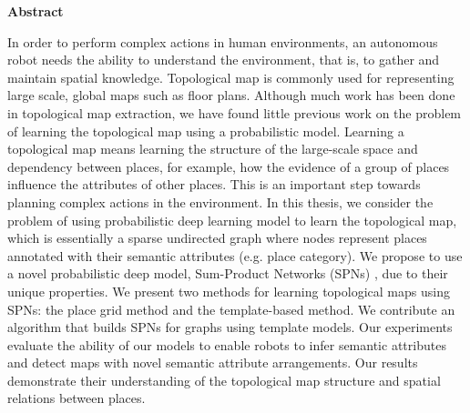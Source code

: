 \documentclass[10pt, titlepage]{article}
\author{Kaiyu Zheng}
\date{April 2017}
\theoremstyle{definition}
\begin{document}


\newpage

\newpage
{} %
\begin{center}\Large \textbf{Abstract}\normalsize\end{center}
In order to perform complex actions in human environments, an autonomous robot needs the ability to understand the environment, that is, to gather and maintain spatial knowledge. Topological map is commonly used for representing large scale, global maps such as floor plans. Although much work has been done in topological map extraction, we have found little previous work on the problem of learning the topological map using a probabilistic model. Learning a topological map means learning the structure of the large-scale space and dependency between places, for example, how the evidence of a group of places influence the attributes of other places. This is an important step towards planning complex actions in the environment. In this thesis, we consider the problem of using probabilistic deep learning model to learn the topological map, which is essentially a sparse undirected graph where nodes represent places annotated with their semantic attributes (e.g. place category). We propose to use a novel probabilistic deep model, Sum-Product Networks (SPNs) \cite{poon2011sum}, due to their unique properties. We present two methods for learning topological maps using SPNs: the place grid method and the template-based method. We contribute an algorithm that builds SPNs for graphs using template models. Our experiments evaluate the ability of our models to enable robots to infer semantic attributes and detect maps with novel semantic attribute arrangements. Our results demonstrate their understanding of the topological map structure and spatial relations between places. 


\newpage
\tableofcontents
 
\newpage
{} %
\end{document}
